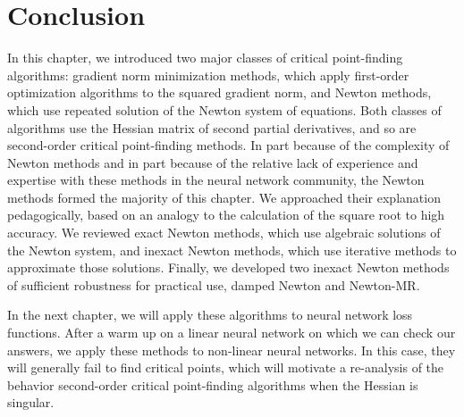 \documentclass[../../thesis.tex]{subfiles}
\begin{document}
\section{Conclusion}

In this chapter,
we introduced two major classes of critical point-finding algorithms:
gradient norm minimization methods,
which apply first-order optimization algorithms
to the squared gradient norm,
and
Newton methods,
which use repeated solution of the Newton system of equations.
Both classes of algorithms
use the Hessian matrix of second partial derivatives,
and so are second-order critical point-finding methods.
In part because of the complexity of Newton methods
and in part because of the relative lack of experience and expertise
with these methods in the neural network community,
the Newton methods formed the majority of this chapter.
We approached their explanation pedagogically,
based on an analogy to the calculation of the square root
to high accuracy.
We reviewed exact Newton methods,
which use algebraic solutions of the Newton system,
and inexact Newton methods,
which use iterative methods to approximate those solutions.
Finally,
we developed two inexact Newton methods
of sufficient robustness for practical use,
damped Newton and Newton-MR.\@

In the next chapter,
we will apply these algorithms to neural network loss functions.
After a warm up on a linear neural network
on which we can check our answers,
we apply these methods to non-linear neural networks.
In this case, they will generally fail
to find critical points,
which will motivate a re-analysis
of the behavior second-order critical point-finding algorithms
when the Hessian is singular.

\onlyinsubfile{\printbibliography}
\end{document}

